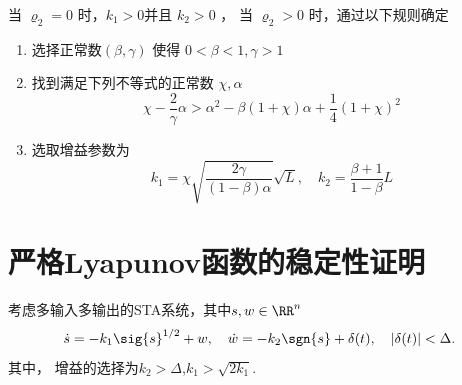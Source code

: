 \begin{algo}\label{algo sta moreno}
	当 $\varrho_2=0$ 时，$k_1>0$并且 $k_2>0$ ，
	当 $\varrho_2>0$ 时，通过以下规则确定
	\begin{enumerate}
		\item  选择正常数$(\beta,\gamma)$ 使得 $0<\beta<1,\gamma>1$
		\item 找到满足下列不等式的正常数 $\chi,\alpha$
		\begin{equation}
			\chi-\frac{2}{\gamma}\alpha
			>\alpha^2-\beta (1+\chi)\alpha+\frac14 (1+\chi)^2
		\end{equation}
		\item 选取增益参数为
		\begin{equation}
			k_1=\chi \sqrt{\frac{2\gamma}{(1-\beta)\alpha}}\sqrt{L},\quad 
			k_2=\frac{\beta+1}{1-\beta}L
		\end{equation}
	\end{enumerate}
\end{algo}

\section{严格Lyapunov函数的稳定性证明}



\begin{proposition}
	\cite[Proposition 1]{morenoStrictLyapunovFunctions2014}
	考虑多输入多输出的STA系统，其中$s,w\in\RR^n$
	\begin{equation}
		\dot{s}=-k_1 \sig{s}^{1/2}+w,\quad 
		\dot{w}=-k_2 \sgn{s}+\delta(t),\quad 
		|\delta(t)|<\Delta.
	\end{equation}
	其中， 增益的选择为$k_2>\Delta$,$k_1>\sqrt{2k_1}$.
\end{proposition}

